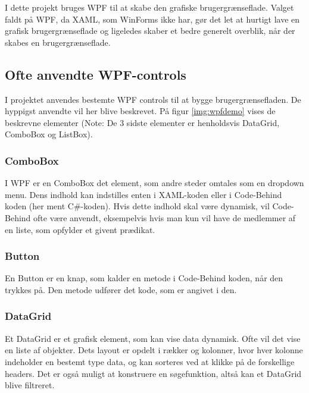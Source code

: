 I dette projekt bruges \ac{WPF} til at skabe den grafiske brugergrænseflade. 
Valget faldt på \ac{WPF}, da \ac{XAML}, som WinForms ikke har, gør det let at hurtigt lave en grafisk brugergrænseflade og ligeledes skaber et bedre generelt overblik, når der skabes en brugergrænseflade.


\subsection{Ofte anvendte WPF-controls}
I projektet anvendes bestemte WPF controls til at bygge brugergrænsefladen. 
De hyppigst anvendte vil her blive beskrevet. 
På figur \ref{img:wpfdemo} vises de beskrevne elementer (Note: De 3 sidste elementer er henholdsvis DataGrid, ComboBox og ListBox).

\subsubsection*{ComboBox}
I WPF er en ComboBox det element, som andre steder omtales som en dropdown menu. 
Dens indhold kan indstilles enten i XAML-koden eller i Code-Behind koden (her ment C\#-koden).
Hvis dette indhold skal være dynamisk, vil Code-Behind ofte være anvendt, eksempelvis hvis man kun vil have de medlemmer af en liste, som opfylder et givent prædikat.

\subsubsection*{Button}
En Button er en knap, som kalder en metode i Code-Behind koden, når den trykkes på. 
Den metode udfører det kode, som er angivet i den.

\subsubsection*{DataGrid}
Et DataGrid er et grafisk element, som kan vise data dynamisk.
Ofte vil det vise en liste af objekter.
Dets layout er opdelt i rækker og kolonner, hvor hver kolonne indeholder en bestemt type data, og kan sorteres ved at klikke på de forskellige headers.
Det er også muligt at konstruere en søgefunktion, altså kan et DataGrid blive filtreret.

